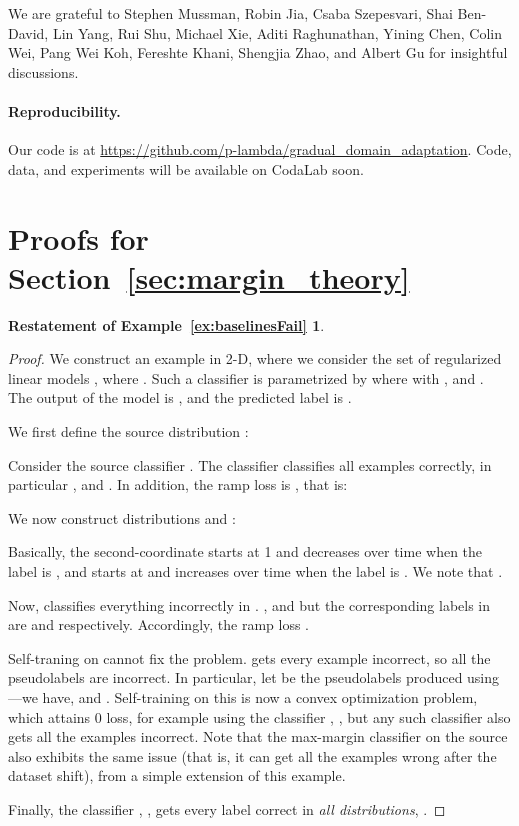 \documentclass[11pt]{article}
\begin{document}
We are grateful to Stephen Mussman, Robin Jia, Csaba Szepesvari, Shai Ben-David, Lin Yang, Rui Shu, Michael Xie, Aditi Raghunathan, Yining Chen, Colin Wei, Pang Wei Koh, Fereshte Khani, Shengjia Zhao, and Albert Gu for insightful discussions.


\paragraph{Reproducibility.}

Our code is at \url{https://github.com/p-lambda/gradual_domain_adaptation}. Code, data, and experiments will be available on CodaLab soon.

 



\appendix

\newpage
\section{Proofs for Section~\ref{sec:margin_theory}}
\label{sec:appendix_margin_theory}

\newtheorem*{baselinesFailExample}{Restatement of Example~\ref{ex:baselinesFail}}

\begin{baselinesFailExample}
\baselinesFailText{}
\end{baselinesFailExample}

\begin{proof}
We construct an example in 2-D, where we consider the set of regularized linear models , where . Such a classifier is parametrized by  where  with , and . The output of the model is , and the predicted label is .

We first define the source distribution :


Consider the source classifier .
The classifier classifies all examples correctly, in particular , and .
In addition, the ramp loss is , that is:

We now construct distributions  and :




Basically, the second-coordinate starts at 1 and decreases over time when the label is , and starts at  and increases over time when the label is .
We note that .

Now,  classifies everything incorrectly in .
, and  but the corresponding labels in  are  and  respectively.
Accordingly, the ramp loss .

Self-traning on  cannot fix the problem.
 gets every example incorrect, so all the pseudolabels are incorrect.
In particular, let  be the pseudolabels produced using ---we have,  and .
Self-training on this is now a convex optimization problem, which attains 0 loss, for example using the classifier , , but any such classifier also gets all the examples incorrect.
Note that the max-margin classifier on the source also exhibits the same issue (that is, it can get all the examples wrong after the dataset shift), from a simple extension of this example.

Finally, the classifier , , gets every label correct in \emph{all distributions}, .


\end{proof}
\end{document}
